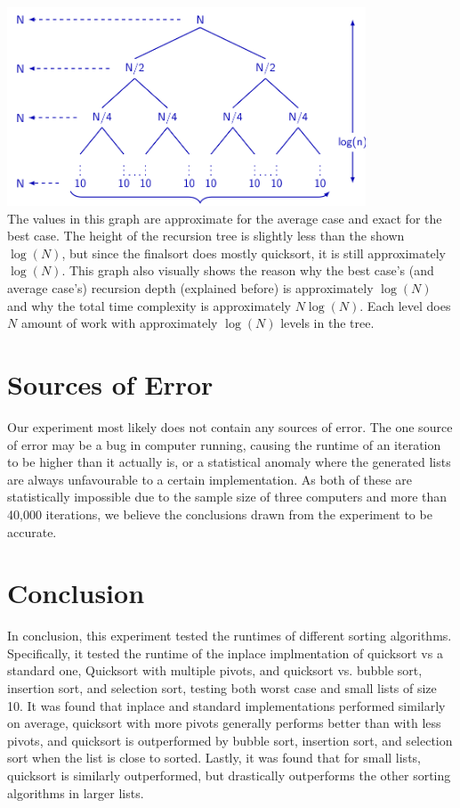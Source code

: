 \documentclass{article}
\begin{document}
\includegraphics[width=0.8\textwidth]{bestCase}\\
The values in this graph are approximate for the average case and exact for the best case. The height of the recursion tree is slightly less than the shown $\log(N)$, but since the finalsort does mostly quicksort, it is still approximately $\log(N)$. This graph also visually shows the reason why the best case's (and average case's) recursion depth (explained before) is approximately $\log(N)$ and why the total time complexity is approximately $N\log(N)$. Each level does $N$ amount of work with approximately $\log(N)$ levels in the tree.


\section*{Sources of Error}
Our experiment most likely does not contain any sources of error. The one source of error may be a bug in computer running, causing the runtime of an iteration to be higher than it actually is, or a statistical anomaly where the generated lists are always unfavourable to a certain implementation. As both of these are statistically impossible due to the sample size of three computers and more than 40,000 iterations, we believe the conclusions drawn from the experiment to be accurate.

\section*{Conclusion}
In conclusion, this experiment tested the runtimes of different sorting algorithms. Specifically, it tested the runtime of the inplace implmentation of quicksort vs a standard one, Quicksort with multiple pivots, and quicksort vs. bubble sort, insertion sort, and selection sort, testing both worst case and small lists of size 10. It was found that inplace and standard implementations performed similarly on average, quicksort with more pivots generally performs better than with less pivots, and quicksort is outperformed by bubble sort, insertion sort, and selection sort when the list is close to sorted. Lastly, it was found that for small lists, quicksort is similarly outperformed, but drastically outperforms the other sorting algorithms in larger lists.
\end{document}
